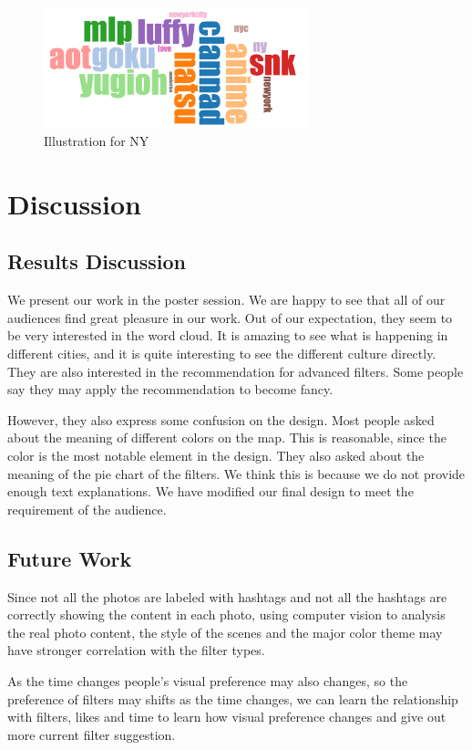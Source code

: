 \documentclass[conference]{acmsiggraph}
\begin{document}
\begin{figure}[ht]
  \centering
\includegraphics[width=3in]{images/ny}
  \caption{Illustration for NY}
  \label{like-filter}
\end{figure}


\section{Discussion}

\subsection{Results Discussion}

We present our work in the poster session. We are happy to see that all of our audiences find great pleasure in our work. Out of our expectation, they seem to be very interested in the word cloud. It is amazing to see what is happening in different cities, and it is quite interesting to see the different culture directly. They are also interested in the recommendation for advanced filters. Some people say they may apply the recommendation to become fancy.


However, they also express some confusion on the  design. Most people asked about the meaning of different colors on the map. This is reasonable, since the color is the most notable element in the design. They also asked about the meaning of the pie chart of the filters. We think this is because we do not provide enough text explanations. We have modified our final design  to meet the requirement of the audience.

\subsection{Future Work}
Since not all the photos are labeled with hashtags and not all the hashtags are correctly showing the content in each photo, using computer vision to analysis the real photo content, the style of the scenes and the major color theme may have stronger correlation with the filter types.

As the time changes people's visual preference may also changes, so the preference of filters may shifts as the time changes, we can learn the relationship with filters, likes and time to learn how visual preference changes and give out more current filter suggestion.
\end{document}
